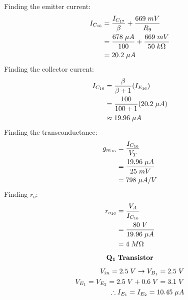 \documentclass{article}
\begin{document}
	Finding the emitter current:
	\begin{align*}
		I_{C_{16}} &= \frac{I_{C_{17}}}{\beta} + \frac{669 \hspace{1mm} mV}{R_9}\\ 
		&= \frac{678 \hspace{1mm} \mu A}{100} + \frac{669 \hspace{1mm} mV}{50 \hspace{1mm} k\Omega}\\ 
		&= 20.2 \hspace{1mm} \mu A
	\end{align*}
	Finding the collector current:
	\begin{align*}
		I_{C_{16}} &= \frac{\beta}{\beta + 1} (I_{E_{16}})\\
		&= \frac{100}{100 + 1} (20.2 \hspace{1mm} \mu A)\\
		&\approx 19.96 \hspace{1mm} \mu A
	\end{align*}
	Finding the transconductance:
	\begin{align*}
		g_{m_{16}} &= \frac{I_{C_{16}}}{V_T}\\
		&= \frac{19.96 \hspace{1mm} \mu A}{25 \hspace{1mm} mV}\\
		&= 798 \hspace{1mm} \mu A/V
	\end{align*}
	Finding $r_o$:
	\begin{align*}
		r_{o_{16}} &= \frac{V_A}{I_{C_{16}}}\\
		&= \frac{80 \hspace{1mm} V}{19.96 \hspace{1mm} \mu A}\\
		&= 4 \hspace{1mm} M\Omega
	\end{align*}
	\begin{align*}
		\mathbf{Q_{1}} \hspace{1mm} \textbf{Transistor}
	\end{align*}
	\begin{align*}
		V_{in} = 2.5 \hspace{1mm} V \rightarrow V_{B_{1}} = 2.5 \hspace{1mm} V\\
		V_{E_{1}} = V_{E_{2}} = 2.5 \hspace{1mm} V + 0.6 \hspace{1mm} V = 3.1 \hspace{1mm} V\\
		\therefore I_{E_1} = I_{E_2} = 10.45 \hspace{1mm} \mu A
	\end{align*}
\end{document}
